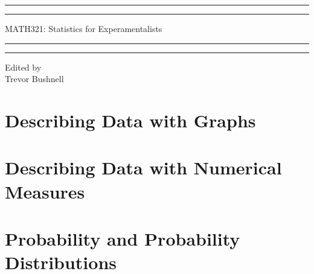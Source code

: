 \documentclass{package/notes}
\begin{document}
	\begin{titlepage} %
		
		\centering %
		
		\scshape %
		
		\vspace*{\baselineskip} %
		
		
		\rule{\textwidth}{1.6pt}\vspace*{-\baselineskip}\vspace*{2pt} %
		\rule{\textwidth}{0.4pt} %
		
		\vspace{0.75\baselineskip} %
		
		{\huge MATH321: Statistics for Experamentalists\\} %
		
		\vspace{0.75\baselineskip} %
		
		\rule{\textwidth}{0.4pt}\vspace*{-\baselineskip}\vspace{3.2pt} %
		\rule{\textwidth}{1.6pt} %
		
		\vspace{2\baselineskip} %
		
		
		
		\vspace*{3\baselineskip} %
		
		
		
		\vspace{0.5\baselineskip} 
		
		\vspace{0.5\baselineskip} 
		
		
		\vfill 
		
		
		
		\vspace{0.3\baselineskip} 
		
		
		{\large Edited by\\  Trevor Bushnell} 
		
	\end{titlepage}
	\tableofcontents
\chapter{Describing Data with Graphs}



\chapter{Describing Data with Numerical Measures}


\chapter{Probability and Probability Distributions}

\end{document}
